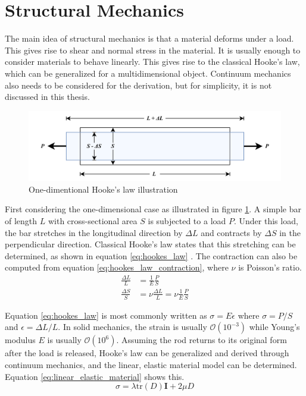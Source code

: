 \section{Structural Mechanics}
\label{chap:solid_mechanics}
The main idea of structural mechanics is that a material deforms under a load. This gives rise to shear and normal stress in the material. It is usually enough to consider materials to behave linearly. This gives rise to the classical Hooke's law, which can be generalized for a multidimensional object. Continuum mechanics also needs to be considered for the derivation, but for simplicity, it is not discussed in this thesis.

\begin{figure}[ht]
	\centering
	\includegraphics[width=0.8\linewidth]{figures/chapter_2/StretchedBar.png}
	\caption{One-dimentional Hooke's law illustration}
	\label{fig:stretched_bar}
\end{figure}
First considering the one-dimensional case as illustrated in figure \ref{fig:stretched_bar}. A simple bar of length $L$ with cross-sectional area $S$ is subjected to a load $P$. Under this load, the bar stretches in the longitudinal direction by $\Delta L$ and contracts by $\Delta S$ in the perpendicular direction. Classical Hooke's law states that this stretching can be determined, as shown in equation \ref{eq:hookes_law} \cite{Lubliner_Papadopoulos_2014}. The contraction can also be computed from equation \ref{eq:hookes_law_contraction}, where $\nu$ is Poisson's ratio.
\begin{subequations}
	\begin{alignat}{2}
		\frac{\Delta L}{L} &= \frac{1}{E}\frac{P}{S} 
		\label{eq:hookes_law} \\
		\frac{\Delta S}{S} &= \nu\frac{\Delta L}{L}=\nu\frac{1}{E}\frac{P}{S} 
		\label{eq:hookes_law_contraction}
	\end{alignat}
\end{subequations}

Equation \ref{eq:hookes_law} is most commonly written as $\sigma=E\epsilon$ where $\sigma=P/S $ and $\epsilon=\Delta L/L$. In solid mechanics, the strain is usually $\mathcal{O}(10^{-3})$ while Young's modulus $E$ is usually $\mathcal{O}(10^6)$. Assuming the rod returns to its original form after the load is released, Hooke's law can be generalized and derived through continuum mechanics, and the linear, elastic material model can be determined. Equation \ref{eq:linear_elastic_material} shows this.
\begin{equation}
	\sigma=\lambda\text{tr}(D)\mathbf I + 2\mu D
	\label{eq:linear_elastic_material}
\end{equation}

